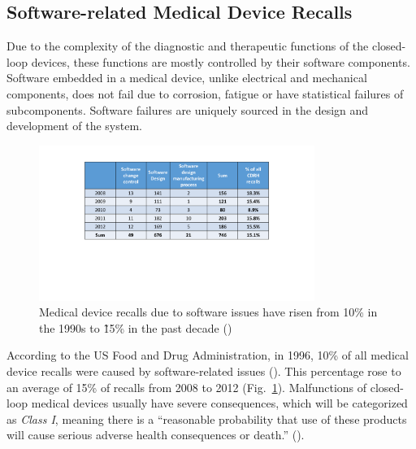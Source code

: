 \documentclass[a4paper]{article}
\newcommand{\figref}[1]{Fig.~\ref{fig:#1}}
\begin{document}
\subsection{Software-related Medical Device Recalls}
Due to the complexity of the diagnostic and therapeutic functions of the closed-loop devices, these functions are mostly controlled by their software components. 
Software embedded in a medical device, unlike electrical and mechanical components, does not fail due to corrosion, fatigue or have statistical failures of subcomponents. Software failures are uniquely sourced in the design and development of the system. %
\begin{figure}[t]
		\centering
		\includegraphics[width=0.8\textwidth]{figs/recalls.pdf}
		\caption{\small Medical device recalls due to software issues have risen from 10\% in the 1990s to \~15\% in the past decade (\cite{recall_rep})}
		\label{fig:soft_recalls}
\end{figure}
According to the US Food and Drug Administration, in 1996, 10\% of all medical device recalls were caused by software-related issues (\cite{medstats}). This percentage rose to an average of 15\% of recalls from 2008 to 2012 (\figref{soft_recalls}). Malfunctions of closed-loop medical devices usually have severe consequences, which will be categorized as \emph{Class I}, meaning there is a ``reasonable probability that use of these products will cause serious adverse health consequences or death.'' (\cite{medstats2,pacemakerrecalls,killedbycode}). 
\end{document}

